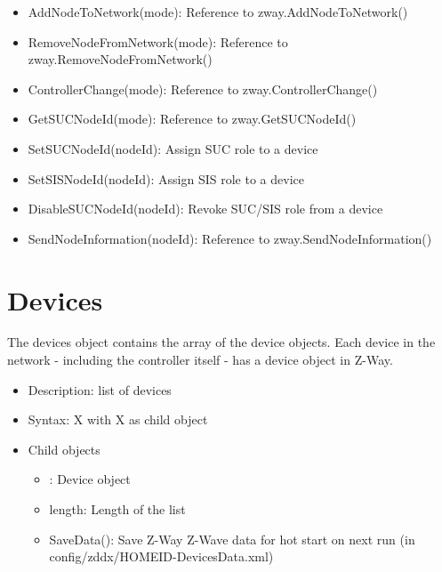 \begin {itemize}
\begin {itemize}
\begin {itemize}
\item  libType library basis type
\item  manufacturerIS / manufacturerProductId / manufacturerProductTypeId: ids to identify the transceiver hardware
\item  memoryGetAddress
\item  memoryGetData
\item  nodeId: own node ID
\item  nonManagementJobs: number of non man. jobs
\item  oldSerialAPIAckTimeout10ms: default timing parameter of serial interface
\item  oldSerialAPIBytetimeout10ms: default timing parameter of serial interface
\item  softwareRevisonDate: written by compiler
\item  softwareRevisionID: written by compiler
\item  vendor: string of hardware vendor
\end {itemize}
\item AddNodeToNetwork(mode): Reference to zway.AddNodeToNetwork()
\item RemoveNodeFromNetwork(mode): Reference to zway.RemoveNodeFromNetwork()
\item ControllerChange(mode): Reference to zway.ControllerChange()
\item GetSUCNodeId(mode): Reference to zway.GetSUCNodeId()
\item SetSUCNodeId(nodeId): Assign SUC role to a device
\item SetSISNodeId(nodeId): Assign SIS role to a device
\item DisableSUCNodeId(nodeId): Revoke SUC/SIS role from a device
\item SendNodeInformation(nodeId): Reference to zway.SendNodeInformation()
\end {itemize}
\end {itemize}


\section{Devices}

The devices object contains the array of the device objects. Each device in the network - including the 
controller itself -  has a device object in Z-Way.

\begin {itemize}
\item Description: list of devices
\item Syntax:  X with  X as child object
\item Child objects
\begin {itemize}
\item [m]: Device object
\item length: Length of the list
\item SaveData(): Save Z-Way Z-Wave data for hot start on next run (in config/zddx/HOMEID-DevicesData.xml)
\end {itemize}
\end {itemize}
 

